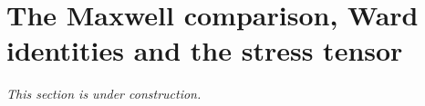 \section{The Maxwell comparison, Ward identities and the stress tensor}\label{sec:partII-G}

\emph{This section is under construction.}
